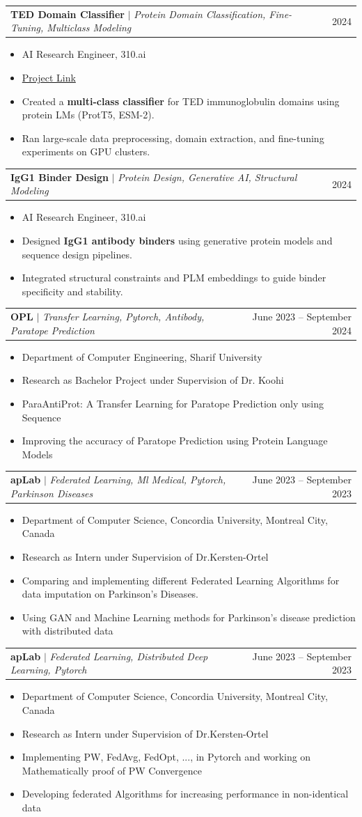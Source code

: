 \documentclass[letterpaper,11pt]{article}
\makeatletter
\newcommand{\resumeItem}[1]{\item\small{#1\vspace{-2pt}}}
\newcommand{\resumeProjectHeading}[2]{
    \item
    \begin{tabular*}{0.97\textwidth}{l@{\extracolsep{\fill}}r}
      \small#1 & #2 \\
    \end{tabular*}\vspace{-7pt}
}
\newcommand{\resumeItemListStart}{\begin{itemize}}
\newcommand{\resumeItemListEnd}{\end{itemize}\vspace{-5pt}}
\makeatother
\begin{document}
        \resumeProjectHeading
        {\textbf{TED Domain Classifier} $|$ \footnotesize\emph{Protein Domain Classification, Fine-Tuning, Multiclass Modeling}}{2024}
        \resumeItemListStart
            \resumeItem{AI Research Engineer, 310.ai}
            \resumeItem{\href{https://github.com/Alirzeanoroozi/TED}{Project Link}}
            \resumeItem{Created a \textbf{multi-class classifier} for TED immunoglobulin domains using protein LMs (ProtT5, ESM-2).}
            \resumeItem{Ran large-scale data preprocessing, domain extraction, and fine-tuning experiments on GPU clusters.}
        \resumeItemListEnd

        \resumeProjectHeading
        {\textbf{IgG1 Binder Design} $|$ \footnotesize\emph{Protein Design, Generative AI, Structural Modeling}}{2024}
        \resumeItemListStart
            \resumeItem{AI Research Engineer, 310.ai}
            \resumeItem{Designed \textbf{IgG1 antibody binders} using generative protein models and sequence design pipelines.}
            \resumeItem{Integrated structural constraints and PLM embeddings to guide binder specificity and stability.}
        \resumeItemListEnd

        \resumeProjectHeading
        {\textbf{OPL} $|$ \footnotesize\emph{Transfer Learning, Pytorch, Antibody, Paratope Prediction}}{June 2023 -- September 2024}
        \resumeItemListStart
            \resumeItem{Department of Computer Engineering, Sharif University}
            \resumeItem{Research as Bachelor Project under Supervision of Dr. Koohi}
            \resumeItem{ParaAntiProt: A Transfer Learning for Paratope Prediction only using Sequence}
            \resumeItem{Improving the accuracy of Paratope Prediction using Protein Language Models}
        \resumeItemListEnd

        \resumeProjectHeading
        {\textbf{apLab} $|$ \footnotesize\emph{Federated Learning, Ml Medical, Pytorch, Parkinson Diseases}}{June 2023 -- September 2023}
        \resumeItemListStart
            \resumeItem{Department of Computer Science, Concordia University, Montreal City, Canada}
            \resumeItem{Research as Intern under Supervision of Dr.Kersten-Ortel}
            \resumeItem{Comparing and implementing different Federated Learning Algorithms for data imputation on Parkinson's Diseases.}
            \resumeItem{Using GAN and Machine Learning methods for Parkinson's disease prediction with distributed data}
        \resumeItemListEnd

        \resumeProjectHeading
        {\textbf{apLab} $|$ \footnotesize\emph{Federated Learning, Distributed Deep Learning, Pytorch}}{June 2023 -- September 2023}
        \resumeItemListStart
            \resumeItem{Department of Computer Science, Concordia University, Montreal City, Canada}
            \resumeItem{Research as Intern under Supervision of Dr.Kersten-Ortel}
            \resumeItem{Implementing PW, FedAvg, FedOpt, ..., in Pytorch and working on Mathematically proof of PW Convergence}
            \resumeItem{Developing federated Algorithms for increasing performance in non-identical data}
        \resumeItemListEnd
\end{document}

